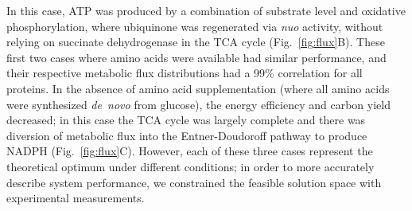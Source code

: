 \documentclass[journal=asbcd6,manuscript=article]{achemso}
\begin{document}
In this case, ATP was produced by a combination of substrate level and oxidative phosphorylation, where
ubiquinone was regenerated via \textit{nuo} activity, without relying on succinate dehydrogenase in the TCA cycle (Fig.~\ref{fig:flux}B).
These first two cases where amino acids were available had similar performance, and their respective metabolic flux distributions had a 99\% correlation for all proteins.
In the absence of amino acid supplementation (where all amino acids were synthesized \textit{de~novo} from glucose),
the energy efficiency and carbon yield decreased; in this case the TCA cycle was largely complete and there was diversion of metabolic flux into the Entner-Doudoroff pathway to produce NADPH (Fig.~\ref{fig:flux}C).
However, each of these three cases represent the theoretical optimum under different conditions; in order to more accurately describe system performance, we constrained the feasible solution space with experimental measurements.


\end{document}
